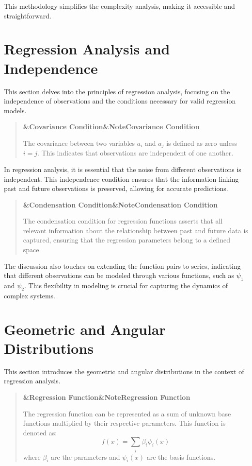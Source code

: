 \documentclass[a4paper]{article}
\newcommand{\boxheading}[1]{%
  \par\smallskip
  \noindent\textbf{\ifx&#1&Note\else#1\fi}\par
  \smallskip
}
\newenvironment{defbox}[1][]{%
  \begin{quote}\color{green!40!black}\boxheading{#1}\normalcolor
}{\end{quote}}
\newenvironment{rembox}[1][]{%
  \begin{quote}\color{black!70}\boxheading{#1}\normalcolor
}{\end{quote}}
\begin{document}
This methodology simplifies the complexity analysis, making it accessible and straightforward.

\section{Regression Analysis and Independence}
This section delves into the principles of regression analysis, focusing on the independence of observations and the conditions necessary for valid regression models.

\begin{defbox}[Covariance Condition]
The covariance between two variables \( a_i \) and \( a_j \) is defined as zero unless \( i = j \). This indicates that observations are independent of one another.
\end{defbox}

In regression analysis, it is essential that the noise from different observations is independent. This independence condition ensures that the information linking past and future observations is preserved, allowing for accurate predictions.

\begin{rembox}[Condensation Condition]
The condensation condition for regression functions asserts that all relevant information about the relationship between past and future data is captured, ensuring that the regression parameters belong to a defined space.
\end{rembox}

The discussion also touches on extending the function pairs to series, indicating that different observations can be modeled through various functions, such as \( \psi_1 \) and \( \psi_2 \). This flexibility in modeling is crucial for capturing the dynamics of complex systems.

\section{Geometric and Angular Distributions}
This section introduces the geometric and angular distributions in the context of regression analysis.

\begin{defbox}[Regression Function]
The regression function can be represented as a sum of unknown base functions multiplied by their respective parameters. This function is denoted as:
\[
f(x) = \sum_{i} \beta_i \psi_i(x)
\]
where \( \beta_i \) are the parameters and \( \psi_i(x) \) are the basis functions.
\end{defbox}
\end{document}
